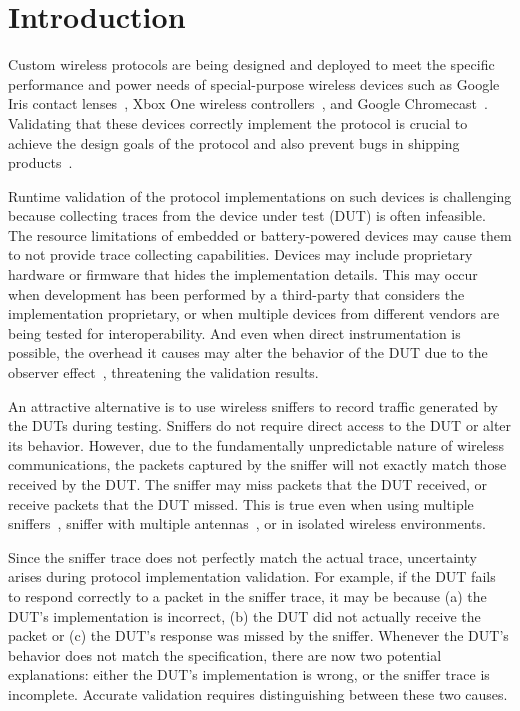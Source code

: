 
\section{Introduction}
\label{sec:intro}

Custom wireless protocols are being designed and deployed to meet the specific
performance and power needs of special-purpose wireless devices such as Google
Iris contact lenses~\cite{iris}, Xbox One wireless controllers~\cite{xbox}, and
Google Chromecast~\cite{chromecast}.  Validating that these devices correctly
implement the protocol is crucial to achieve the design goals of the protocol
and also prevent bugs in shipping products~\cite{wifried,lollipop,surface}.


Runtime validation of the protocol implementations on such devices is
challenging because collecting traces from the device under test (DUT) is often
infeasible.  The resource limitations of embedded or battery-powered devices may
cause them to not provide trace collecting capabilities. Devices may include
proprietary hardware or firmware that hides the implementation details. This may
occur when development has been performed by a third-party that considers the
implementation proprietary, or when multiple devices from different vendors are
being tested for interoperability. And even when direct instrumentation is
possible, the overhead it causes may alter the behavior of the DUT due to the
observer effect~\cite{mytkowicz2008observer}, threatening the validation
results.

An attractive alternative is to use wireless
sniffers to record traffic generated by the DUTs during testing.
Sniffers do not require direct access to the DUT or alter its behavior.
However, due to the fundamentally unpredictable nature of wireless
communications, the packets captured by the sniffer will not exactly match
those received by the DUT.
The sniffer may miss packets that the DUT received, or receive packets that
the DUT missed.
This is true even when using multiple
sniffers~\cite{cheng2006jigsaw,mahajan2006analyzing,bahl2006enhancing}, sniffer
with multiple antennas~\cite{omnipeek}, or in isolated wireless environments.

Since the sniffer trace does not perfectly match the actual trace, uncertainty
arises during protocol implementation validation.  For example, if the DUT fails
to respond correctly to a packet in the sniffer trace, it may be because (a) the
DUT's implementation is incorrect, (b) the DUT did not actually receive the
packet or (c) the DUT's response was missed by the sniffer.  Whenever the DUT's
behavior does not match the specification, there are now two potential
explanations: either the DUT's implementation is wrong, or the sniffer trace is
incomplete.  Accurate validation requires  distinguishing between these two
causes.

